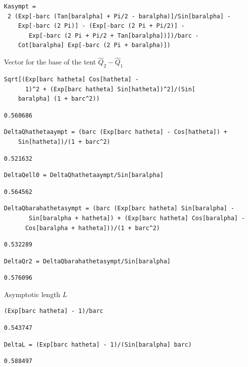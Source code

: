 \documentclass[reqno]{amsart}
\theoremstyle{definition} \newtheorem{definition}{Definition}[section]
\theoremstyle{definition} \newtheorem{remark}[definition]{Remark}
\theoremstyle{plain} \newtheorem{lemma}[definition]{Lemma}
\theoremstyle{plain} \newtheorem{proposition}[definition]{Proposition}
\theoremstyle{plain} \newtheorem{theorem}[definition]{Theorem}
\theoremstyle{plain} \newtheorem{corollary}[definition]{Corollary}
\theoremstyle{definition} \newtheorem{example}[definition]{Example}
\theoremstyle{plain} \newtheorem{claim}[clai]{Claim}
\theoremstyle{definition} \newtheorem{assumption}[definition]{Assumption}
\theoremstyle{definition} \newtheorem{observation}[definition]{Observation}
\newcommand{\1}{\mathbbm 1}
\newcommand{\smed}{\medskip}
\numberwithin{equation}{section} %
\theoremstyle{plain} \newtheorem*{theorem*}{Theorem}
\theoremstyle{plain} \newtheorem{mthm}[maintheorem]{Main Theorem}
\theoremstyle{plain} \newtheorem*{mthm*}{Main Theorem}
\theoremstyle{plain} \newtheorem*{conjecture*}{Conjecture}
\theoremstyle{plain} \newtheorem{conjecture}[definition]{Conjecture}
\theoremstyle{plain} \newtheorem*{problem*}{Problem}
\begin{document}
\begin{verbatim}
Kasympt = 
 2 (Exp[-barc (Tan[baralpha] + Pi/2 - baralpha)]/Sin[baralpha] - 
    Exp[-barc (2 Pi)] - (Exp[-barc (2 Pi + Pi/2)] - 
       Exp[-barc (2 Pi + Pi/2 + Tan[baralpha])])/barc - 
    Cot[baralpha] Exp[-barc (2 Pi + baralpha)])
\end{verbatim}
\smed
Vector for the base of the tent $\hat Q_2 - \hat Q_1$
\smed
\begin{verbatim}
Sqrt[(Exp[barc hatheta] Cos[hatheta] - 
      1)^2 + (Exp[barc hatheta] Sin[hatheta])^2]/(Sin[
    baralpha] (1 + barc^2))
\end{verbatim}
\begin{verbatim}
0.560686
\end{verbatim}
\begin{verbatim}
DeltaQhathetaaympt = (barc (Exp[barc hatheta] - Cos[hatheta]) + 
    Sin[hatheta])/(1 + barc^2)
\end{verbatim}
\begin{verbatim}
0.521632
\end{verbatim}
\begin{verbatim}
DeltaQell0 = DeltaQhathetaaympt/Sin[baralpha]
\end{verbatim}
\begin{verbatim}
0.564562
\end{verbatim}
\begin{verbatim}
DeltaQbarahathetasympt = (barc (Exp[barc hatheta] Sin[baralpha] - 
       Sin[baralpha + hatheta]) + (Exp[barc hatheta] Cos[baralpha] - 
      Cos[baralpha + hatheta]))/(1 + barc^2)
\end{verbatim}
\begin{verbatim}
0.532289
\end{verbatim}
\begin{verbatim}
DeltaQr2 = DeltaQbarahathetasympt/Sin[baralpha]
\end{verbatim}
\begin{verbatim}
0.576096
\end{verbatim}
\smed
Asymptotic length $L$
\smed
\begin{verbatim}
(Exp[barc hatheta] - 1)/barc
\end{verbatim}
\begin{verbatim}
0.543747
\end{verbatim}
\begin{verbatim}
DeltaL = (Exp[barc hatheta] - 1)/(Sin[baralpha] barc)
\end{verbatim}
\begin{verbatim}
0.588497
\end{verbatim}
\end{document}
